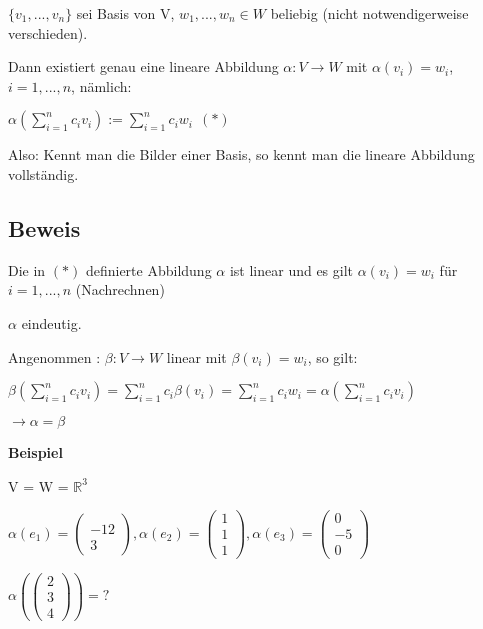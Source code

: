 \documentclass[a4paper, openany]{book}
\begin{document}
      $\{v_1, ..., v_n \}$ sei Basis von V, $w_1, ..., w_n \in W$ beliebig (nicht notwendigerweise verschieden).

      Dann existiert genau eine lineare Abbildung $\alpha : V \rightarrow W$ mit $\alpha(v_i) = w_i$, $i=1,...,n$, nämlich:

      \begin{center}
        $\alpha(\sum_{i=1}^n c_i v_i) := \sum_{i=1}^n c_i w_i \ \ (*)$
      \end{center}

      Also: Kennt man die Bilder einer Basis, so kennt man die lineare Abbildung vollständig.

      \subsection{Beweis}
      Die in $(*)$ definierte Abbildung $\alpha$ ist linear und es gilt $\alpha(v_i) = w_i$ für $i=1, ..., n$ (Nachrechnen)

      $\alpha$ eindeutig.

      Angenommen : $\beta : V \rightarrow W$ linear mit $\beta(v_i) = w_i$, so gilt:

      \begin{center}
        $\beta(\sum_{i=1}^n c_i v_i) = \sum_{i=1}^n c_i \beta(v_i) = \sum_{i=1}^n c_i w_i = \alpha(\sum_{i=1}^n c_i v_i)$

        $\rightarrow \alpha = \beta$
      \end{center}

      \textbf{Beispiel}

      V = W = $\mathbb{R}^3$

      $\alpha(e_1) = \begin{pmatrix} \\ -12 \\ 3 \end{pmatrix}, \alpha(e_2) = \begin{pmatrix}1 \\ 1 \\ 1 \end{pmatrix}, \alpha(e_3) = \begin{pmatrix}0 \\ -5 \\ 0 \end{pmatrix}$

      \par \medskip

      $\alpha(\begin{pmatrix}2 \\ 3 \\4 \end{pmatrix}) = ?$
\end{document}
